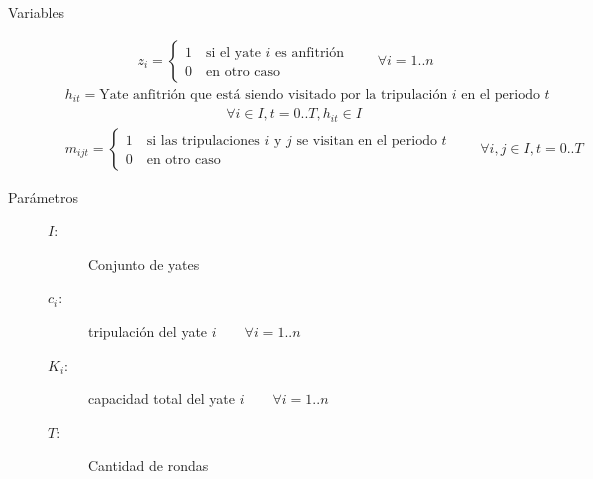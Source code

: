 \documentclass[letter, 10pt]{article}
\begin{document}
\begin{description}
    \item[Variables] \hfill
    \begin{align*}
        &z_i = \begin{cases} 1 \quad \text{si el yate $i$ es anfitrión} \\ 0 \quad \text{en otro caso} \end{cases}
        \qquad \forall i=1..n
      \end{align*}
      \begin{align*}
          &h_{it} = \text{Yate anfitrión que está siendo visitado por la tripulación $i$ en el periodo $t$}
      \end{align*}
      \begin{align*}
           \qquad \forall i\in I, t=0..T, h_{it}\in I
      \end{align*}
      \begin{align*}
        &m_{ijt} = \begin{cases} 1 \quad \text{si las tripulaciones $i$ y $j$ se visitan en el periodo $t$} \\ 0 \quad \text{en otro caso} \end{cases}
        \qquad \forall i,j\in I, t=0..T
      \end{align*}
  \item[Parámetros] \hfill
    \begin{description}
      \item[$I$:] Conjunto de yates
      \item[$c_i$:] tripulación del yate $i \qquad \forall i=1..n$
      \item[$K_i$:] capacidad total del yate $i \qquad \forall i=1..n$
      \item[$T$:] Cantidad de rondas
    \end{description}


\end{description}
\end{document}
